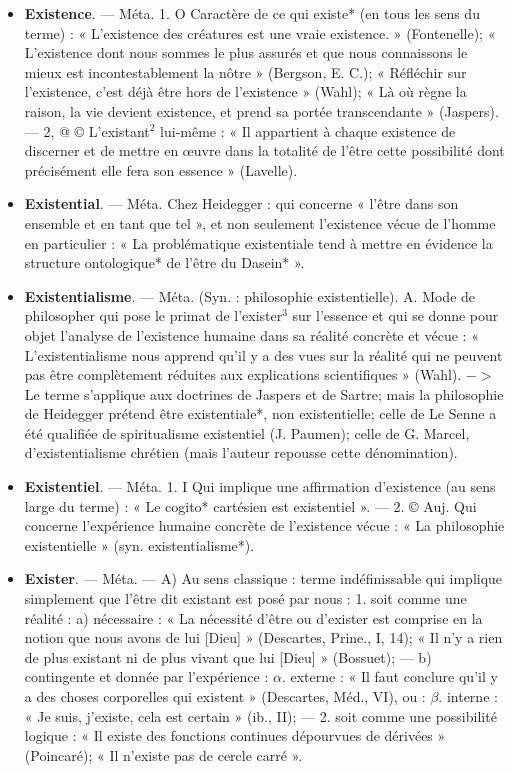 \begin{itemize}[leftmargin=1cm, label=, itemsep=1pt]
\item {\bf Existence}. — Méta. 1. O Caractère de
ce qui existe* (en tous les sens du
terme) : « L'existence des créatures
est une vraie existence. » (Fontenelle); « L’existence dont nous
sommes le plus assurés et que nous
connaissons le mieux est incontestablement la nôtre » (Bergson, E. C.);
« Réfléchir sur l’existence, c’est déjà
être hors de l'existence » (Wahl);
« Là où règne la raison, la vie devient
existence, et prend sa portée transcendante » (Jaspers). — 2, @ ©
L’existant$^2$ lui-même : « Il appartient
à chaque existence de discerner et de
mettre en œuvre dans la totalité de
l'être cette possibilité dont précisément elle fera son essence » (Lavelle).

\item {\bf Existential}. — Méta. Chez Heidegger :
qui concerne « l’être dans son ensemble et en tant que tel », et non
seulement l'existence vécue de
l’homme en particulier : « La problématique existentiale tend à mettre
en évidence la structure ontologique* de l’être du Dasein* ».

\item {\bf Existentialisme}. — Méta. (Syn. : philosophie existentielle). A. Mode de
philosopher qui pose le primat de
l’exister$^3$ sur l'essence et qui se
donne pour objet l’analyse de l’existence humaine dans sa réalité concrète et vécue : « L’existentialisme
nous apprend qu'il y a des vues sur
la réalité qui ne peuvent pas être
complètement réduites aux explications scientifiques » (Wahl). $->$
Le terme s'applique aux doctrines
de Jaspers et de Sartre; mais la
philosophie de Heidegger prétend
être existentiale*, non existentielle;
celle de Le Senne a été qualifiée de
spiritualisme existentiel (J. Paumen);
celle de G. Marcel, d’existentialisme
chrétien (mais l’auteur repousse
cette dénomination).

\item {\bf Existentiel}. — Méta. 1. I Qui implique
une affirmation d’existence (au sens
large du terme) : « Le cogito* cartésien est existentiel ». — 2. © Auj.
Qui concerne l'expérience humaine
concrète de l'existence vécue : « La
philosophie existentielle » (syn.
existentialisme*).

\item {\bf Exister}. — Méta. — A) Au sens classique : terme indéfinissable qui implique simplement que l'être dit
existant est posé par nous : 1. soit
comme une réalité : a) nécessaire :
« La nécessité d’être ou d’exister est
comprise en la notion que nous
avons de lui [Dieu] » (Descartes,
Prine., I, 14); « Il n’y a rien de plus
existant ni de plus vivant que lui
[Dieu] » (Bossuet); — b) contingente
et donnée par l'expérience : $\alpha$. externe : « Il faut conclure qu'il y a
des choses corporelles qui existent »
(Descartes, Méd., VI), ou : $\beta$. interne : « Je suis, j'existe, cela est
certain » (ib., II); — 2. soit comme
une possibilité logique : « Il existe
des fonctions continues dépourvues
de dérivées » (Poincaré); « Il n'existe
pas de cercle carré ».


\end{itemize}
